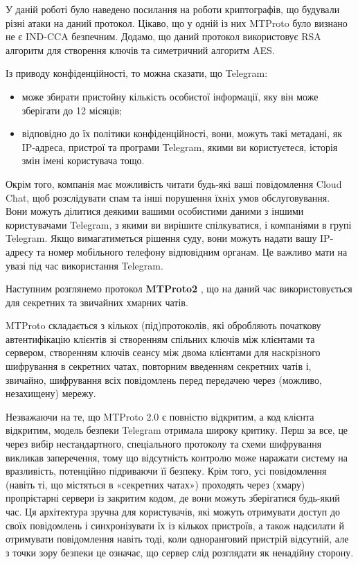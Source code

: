 У даній роботі було наведено посилання \cite{telegramSecurityAnalysis} на роботи криптографів, що будували різні атаки на даний протокол. Цікаво, що у одній із них MTProto було визнано не є IND-CCA безпечним. Додамо, що даний протокол використовує RSA алгоритм для створення ключів та симетричний алгоритм AES.


Із приводу конфіденційності, то можна сказати, що Telegram:
\begin{itemize}
    \item може збирати пристойну кількість особистої інформації, яку він може зберігати до 12 місяців;
    \item відповідно до їх політики конфіденційності, вони, можуть такі метадані, як IP-адреса, пристрої та програми Telegram, якими ви користуєтеся, історія змін імені користувача тощо.
\end{itemize}


Окрім того, компанія має можливість читати будь-які ваші повідомлення Cloud Chat, щоб розслідувати спам та інші порушення їхніх умов обслуговування. Вони можуть ділитися деякими вашими особистими даними з іншими користувачами Telegram, з якими ви вирішите спілкуватися, і компаніями в групі Telegram. Якщо вимагатиметься рішення суду, вони можуть надати вашу IP-адресу та номер мобільного телефону відповідним органам. Це важливо мати на увазі під час використання Telegram.


Наступним розглянемо протокол \textbf{MTProto2} \cite{telegram_mtproto2}, що на даний час використовується для секретних та звичайних хмарних чатів. 

MTProto складається з кількох (під)протоколів, які обробляють початкову автентифікацію клієнтів зі створенням спільних ключів між клієнтами та сервером, створенням ключів сеансу між двома клієнтами для наскрізного шифрування в секретних чатах, повторним введенням секретних чатів і, звичайно, шифрування всіх повідомлень перед передачею через (можливо, незахищену) мережу.

Незважаючи на те, що MTProto 2.0 є повністю відкритим, а код клієнта відкритим, модель безпеки Telegram отримала широку критику. Перш за все, це через вибір нестандартного, спеціального протоколу та схеми шифрування викликав заперечення, тому що відсутність контролю може наражати систему на вразливість, потенційно підриваючи її безпеку. Крім того, усі повідомлення (навіть ті, що містяться в «секретних чатах») проходять через (хмару) пропрієтарні сервери із закритим кодом, де вони можуть зберігатися будь-який час. Ця архітектура зручна для користувачів, які можуть отримувати доступ до своїх повідомлень і синхронізувати їх із кількох пристроїв, а також надсилати й отримувати повідомлення навіть тоді, коли одноранговий пристрій відсутній, але з точки зору безпеки це означає, що сервер слід розглядати як ненадійну сторону.


